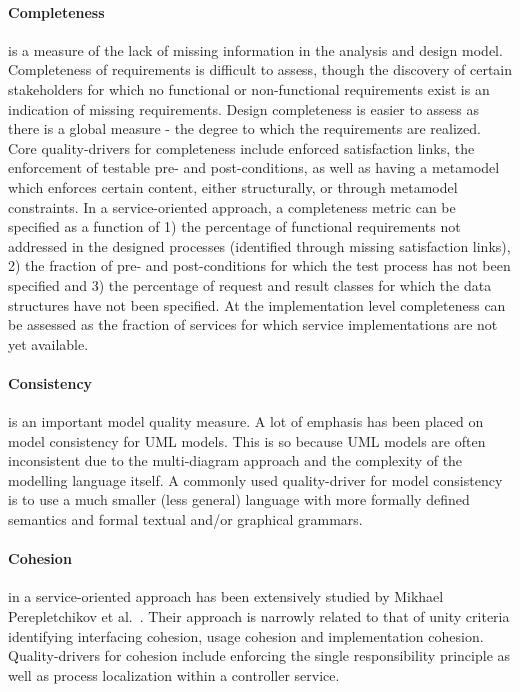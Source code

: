 \paragraph{Completeness} is a measure of the lack of missing information in the analysis and design model. Completeness of requirements is difficult to assess, though the discovery of certain stakeholders for which no functional or non-functional requirements exist is an indication of missing requirements. Design completeness is easier to assess as there is a global measure - the degree to which the requirements are realized. Core quality-drivers for completeness include enforced satisfaction links, the enforcement of testable pre- and post-conditions, as well as having a metamodel which enforces certain content, either structurally, or through metamodel constraints. In a service-oriented approach, a completeness metric can be specified as a function of 1) the percentage of functional requirements not addressed in the designed processes (identified through missing satisfaction links)\cite{shim_design_2008}, 2) the fraction of pre- and post-conditions for which the test process has not been specified and 3) the percentage of request and result classes for which the data structures have not been specified. At the implementation level completeness can be assessed as the fraction of services for which service implementations are not yet available.

\paragraph{Consistency} is an important model quality measure. A lot of emphasis has been placed on model consistency for UML models. This is so because UML models are often inconsistent due to the multi-diagram approach and the complexity of the modelling language itself. A commonly used quality-driver for model consistency is to use a much smaller (less general) language with more formally defined semantics and formal textual and/or graphical grammars. 

\paragraph{Cohesion} in a service-oriented approach has been extensively studied by Mikhael Perepletchikov et al.\ \cite{perepletchikov_cohesion_2007,perepletchikov_impact_2010}. Their approach is narrowly related to that of unity criteria \cite{gonzalez_unity_2009} identifying interfacing cohesion, usage cohesion and implementation cohesion. Quality-drivers for cohesion include enforcing the single responsibility principle as well as process localization within a controller service.


